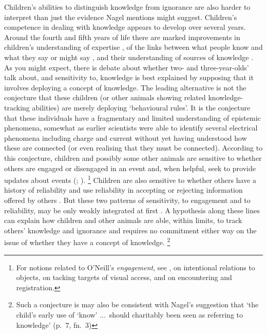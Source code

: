 \documentclass[11pt,a4paper]{extarticle}
\begin{document}
Children's abilities to distinguish knowledge from ignorance are also harder to interpret than just the evidence Nagel mentions might suggest.
Children's competence in dealing with knowledge appears to develop over several years.
Around the fourth and fifth years of life there are marked improvements in 
children's understanding of expertise 
\citep{lutz_early_2002,sobel_children_2010},
of the links between what people know and what they say or might say \citep{Robinson:1994nw,Robinson:2010uq},
and their understanding of sources of knowledge \citep{ONeill:1992ct,ONeill:2001co,Robinson:2006vl}.
As you might expect,
there is debate about whether two- and three-year-olds' talk about, and sensitivity to, knowledge is best explained by supposing that it involves deploying a concept of knowledge.
The leading alternative is not the conjecture that these children (or other animals showing related knowledge-tracking abilities) are merely deploying `behavioural rules'.
It is the conjecture that these individuals have a fragmentary and limited understanding of epistemic phenomena, somewhat as earlier scientists were able to identify several electrical phenomena including charge and current without yet having understood how these are connected (or even realising that they must be connected).
According to this conjecture, children and possibly some other animals are sensitive to whether others are engaged or disengaged in an event and, when helpful, seek to provide updates about events 
(\citealp[pp.\ 88-9]{ONeill:2005ff};
\citealp{viranyi_nonverbal_2005}).%
\footnote{
For notions related to O'Neill's \emph{engagement}, see 
\citet{Doherty:2006wz}, 
\citet{Gomez:2007fk} on intentional relations to objects, 
 \citet[p.\ 58]{Call:2005qe} on tacking targets of visual access,
and \citet{butterfill_minimal} on encountering and registration.
}
Children are also sensitive to whether others have a history of reliability and use reliability in accepting or rejecting information offered by others \citep{Koenig:2005rc,birch_three-_2008}.
But these two patterns of sensitivity, to engagement and to reliability, may be only weakly integrated at first \citep{nurmsoo_childrens_2009,nurmsoo_identifying_2009}.
A hypothesis along these lines can explain how children and other animals are able, within limits, to track others' knowledge and ignorance 
and requires no commitment either way on the issue of whether they have a concept of knowledge.%
\footnote{
Such a conjecture is may also be consistent with Nagel's suggestion that `the child's early use of `know' ...\ should charitably been seen as referring to knowledge' (p.\ 7, fn.\ 3)
}
\end{document}
